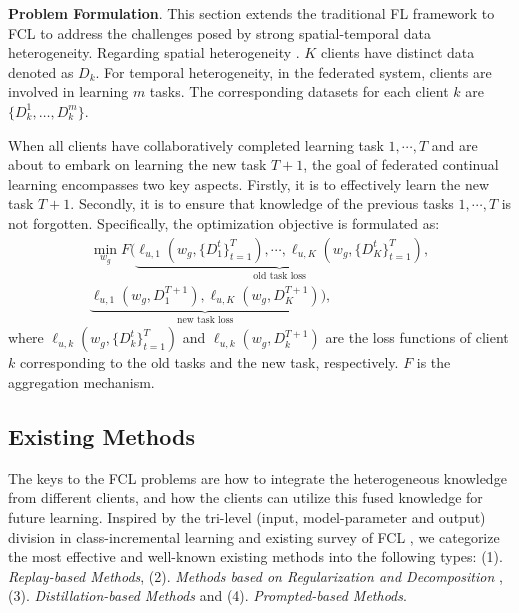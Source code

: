 \textbf{Problem Formulation}.
This section extends the traditional FL framework to FCL to address the challenges posed by strong spatial-temporal data heterogeneity. 
Regarding spatial heterogeneity \cite{yoon2021federated,dong2022federated,ma2022continual}. $K$ clients have distinct data denoted as $D_k$. For temporal heterogeneity, in the federated system, clients are involved in learning $m$ tasks. The corresponding datasets for each client $k$ are $\{D_k^1,\ldots,D_k^{m}\}$.

When all clients have collaboratively completed learning task $1, \cdots, T$ and are about to embark on learning the new task $T + 1$, the goal of federated continual learning encompasses two key aspects. Firstly, it is to effectively learn the new task $T+1$. Secondly, it is to ensure that knowledge of the previous tasks $1,\cdots,T$ is not forgotten. Specifically, the optimization objective is formulated as:
\begin{equation}
\begin{split}
    \min_{w_g}F\Big(\underbrace{\ell_{u,1}(w_g,\{D_1^t\}_{t = 1}^T), \cdots, \ell_{u,K}(w_g,\{D_K^t\}_{t = 1}^T)}_{\text{old task loss}}, \\ \underbrace{\ell_{u,1}(w_g,D_1^{T + 1}),\ell_{u,K}(w_g,D_K^{T + 1})}_{\text{new task loss}}\Big),
    \end{split}
\end{equation}
where $\ell_{u,k}(w_g,\{D_k^t\}_{t = 1}^T)$ and $\ell_{u,k}(w_g,D_k^{T + 1})$ are the loss functions of client $k$ corresponding to the old tasks and the new task, respectively. $F$ is the aggregation mechanism.

\subsection{Existing Methods}

The keys to the FCL problems are how to integrate the heterogeneous knowledge from different clients, and how the clients can utilize this fused knowledge for future learning. Inspired by the tri-level (input, model-parameter and output) division in class-incremental learning \cite{zhou2024class} and existing survey of FCL \cite{yang2024federatedcl,wang2024federated}, we categorize the most effective and well-known existing methods into the following types: (1). \textit{Replay-based Methods}, (2). \textit{Methods based on Regularization and Decomposition
}, (3). \textit{Distillation-based Methods} and (4). \textit{Prompted-based Methods}.

